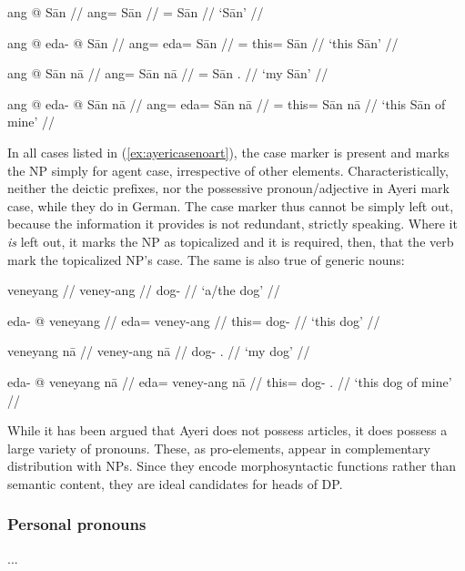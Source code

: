 \pex\label{ex:ayericasenoart}
	\a
	\begingl
		\gla ang @ Sān //
		\glb ang= Sān //
		\glc \Aarg{}= Sān //
		\glft `Sān' //
	\endgl

	\a\begingl
		\gla ang @ eda- @ Sān //
		\glb ang= eda= Sān //
		\glc \Aarg{}= this= Sān //
		\glft `this Sān' //
	\endgl

	\a\label{ex:naaadj}\begingl
		\gla ang @ Sān nā //
		\glb ang= Sān nā //
		\glc \Aarg{}= Sān \Fsg{}.\Gen{} //
		\glft `my Sān' //
	\endgl

	\a\ljudge\ques\begingl
		\gla ang @ eda- @ Sān nā //
		\glb ang= eda= Sān nā //
		\glc \Aarg{}= this= Sān nā //
		\glft `this Sān of mine' //
	\endgl
\xe

In all cases listed in (\ref{ex:ayericasenoart}), the case marker is present
and marks the NP simply for agent case, irrespective of other elements.
Characteristically, neither the deictic prefixes, nor the possessive
pronoun/adjective in Ayeri mark case, while they do in German. The case marker
thus cannot be simply left out, because the information it provides is not
redundant, strictly speaking. Where it \emph{is} left out, it marks the NP as
topicalized and it is required, then, that the verb mark the topicalized NP's
case. The same is also true of generic nouns:

\pex
	\a
	\begingl
		\gla veneyang //
		\glb veney-ang //
		\glc dog-\Aarg{} //
		\glft `a/the dog' //
	\endgl

	\a\begingl
		\gla eda- @ veneyang //
		\glb eda= veney-ang //
		\glc this= dog-\Aarg{} //
		\glft `this dog' //
	\endgl

	\a\begingl
		\gla veneyang nā //
		\glb veney-ang nā //
		\glc dog-\Aarg{} \Fsg{}.\Gen{} //
		\glft `my dog' //
	\endgl

	\a\begingl
		\gla eda- @ veneyang nā //
		\glb eda= veney-ang nā //
		\glc this= dog-\Aarg{} \Fsg{}.\Gen{} //
		\glft `this dog of mine' //
	\endgl
\xe

While it has been argued that Ayeri does not possess articles, it does possess 
a large variety of pronouns. These, as pro-elements, appear in complementary
distribution with NPs. Since they encode morphosyntactic functions rather than
semantic content, they are ideal candidates for heads of DP.

\subsubsection{Personal pronouns}

...

